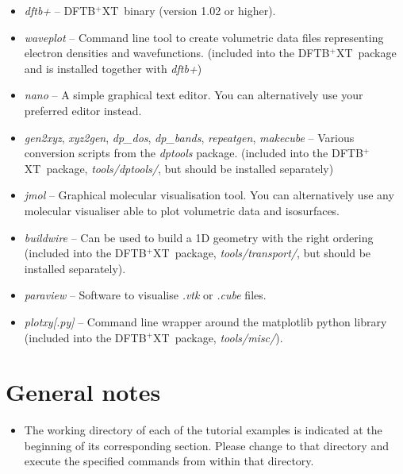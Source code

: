 \documentclass[a4paper,11pt,english]{sphinxmanual}
\newcommand{\dftbpxt}{\textsf{DFTB$^{\text{+}}$XT\ }} %
\begin{document}
{{\begin{itemize}
  
\item {} 
\emph{dftb+} -- \dftbpxt binary (version 1.02 or higher).

\item {} 
\emph{waveplot} -- Command line tool to create volumetric data files
representing electron densities and wavefunctions. (included into the \dftbpxt package and is installed together with \emph{dftb+}) 

\item {} 
\emph{nano} -- A simple graphical text editor. You can alternatively
use your preferred editor instead.

\item {} 
\emph{gen2xyz}, \emph{xyz2gen}, \emph{dp\_dos}, \emph{dp\_bands}, \emph{repeatgen}, \emph{makecube} -- Various conversion scripts from
the \emph{dptools} package. (included into the \dftbpxt package, \emph{tools/dptools/}, but should be installed separately)

\item {} 
\emph{jmol} -- Graphical molecular visualisation tool. You can
alternatively use any molecular visualiser able to plot volumetric
data and isosurfaces.

\item {} 
\emph{buildwire} -- Can be used to build a 1D geometry with the right ordering (included into the \dftbpxt package, \emph{tools/transport/}, but should be installed separately).

\item {} 
\emph{paraview} -- Software to visualise \emph{.vtk} or \emph{.cube} files.

\item {} 
\emph{plotxy[.py]} -- Command line wrapper around the matplotlib python library (included into the \dftbpxt package, \emph{tools/misc/}).  

\end{itemize}


\section{General notes}
\label{introduction:general-notes}\begin{itemize}
\item {} 
The working directory of each of the tutorial examples is indicated
at the beginning of its corresponding section. Please change to that
directory and execute the specified commands from within that
directory.


\end{itemize}}}
\end{document}
